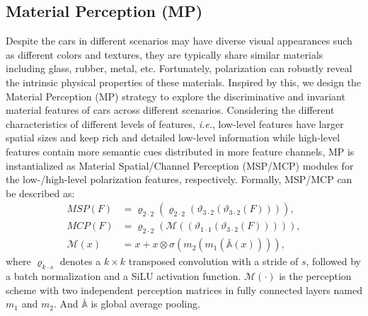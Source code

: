 \subsection{Material Perception (MP)}
Despite the cars in different scenarios may have diverse visual appearances such as different colors and textures, they are typically share similar materials including glass, rubber, metal, etc. Fortunately, polarization can robustly reveal the intrinsic physical properties of these materials. Inspired by this, we design the Material Perception (MP) strategy to explore
the discriminative and invariant material features of cars across different scenarios. Considering the different characteristics of different levels of features, \textit{i.e.}, low-level features have larger spatial sizes and keep rich and detailed low-level information while high-level features contain more semantic cues distributed in more feature channels, MP is instantialized as Material Spatial/Channel Perception (MSP/MCP) modules for the low-/high-level polarization features, respectively. Formally, MSP/MCP can be described as:
\begin{align} \label{eq:mpm}
    MSP(F) &=\varrho_{2\cdot2}(\varrho_{2\cdot2}(\vartheta_{3\cdot2}(\vartheta_{3\cdot2}(F)))), \\
    MCP(F) &=\varrho_{2\cdot2}(\mathcal{M}((\vartheta_{1\cdot1}(\vartheta_{3\cdot2}(F))))), \\
    \mathcal{M}(x) &=x+x\otimes\sigma(m_2(m_1(\bar{\mathbb{A}}(x)))),
\end{align}
where $\varrho_{k\cdot s}$ denotes a $k \times k$ transposed convolution with a stride of $s$, followed by a batch normalization and a SiLU activation function. $\mathcal{M}(\cdot)$ is the perception scheme with two independent perception matrices in fully connected layers named $m_1$ and $m_2$. And $\bar{\mathbb{A}}$ is global average pooling.

